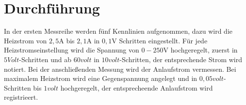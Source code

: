 \section{Durchführung}
\label{sec:Durchführung}
In der ersten Messreihe werden fünf Kennlinien aufgenommen, dazu wird die Heizstrom von $2,5\si{\ampere}$ bis $2,1\si{\ampere}$
in $0,1\si{\volt}$ Schritten eingestellt. Für jede Heizstromseinstellung wird die Spannung von $0-250\si{\volt}$ hochgeregelt,
zuerst in $5\si{Volt}$-Schritten und ab $60\si{volt}$ in $10\si{volt}$-Schritten,
der entsprechende Strom wird notiert.
Bei der anschließenden Messung wird der Anlaufstrom vermessen. Bei maximalem Heizstrom wird eine Gegenspannung angelegt und
in $0,05\si{volt}$-Schritten bis $1\si{volt}$ hochgeregelt, der entsprecheende Anlaufstrom wird registrieert.
